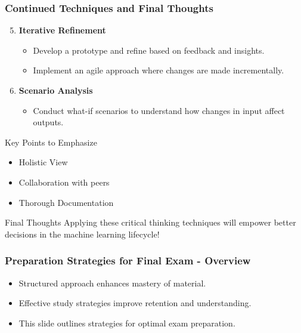 \documentclass[aspectratio=169]{beamer}
\begin{document}
\begin{frame}[fragile]
    \frametitle{Continued Techniques and Final Thoughts}
    \begin{enumerate}
        \setcounter{enumi}{4}
        \item \textbf{Iterative Refinement}
            \begin{itemize}
                \item Develop a prototype and refine based on feedback and insights.
                \item Implement an agile approach where changes are made incrementally.
            \end{itemize}
        \item \textbf{Scenario Analysis}
            \begin{itemize}
                \item Conduct what-if scenarios to understand how changes in input affect outputs.
            \end{itemize}
    \end{enumerate}
    
    \begin{block}{Key Points to Emphasize}
        \begin{itemize}
            \item Holistic View
            \item Collaboration with peers
            \item Thorough Documentation
        \end{itemize}
    \end{block}

    \begin{block}{Final Thoughts}
        Applying these critical thinking techniques will empower better decisions in the machine learning lifecycle!
    \end{block}
\end{frame}

\begin{frame}[fragile]
    \frametitle{Preparation Strategies for Final Exam - Overview}
    \begin{itemize}
        \item Structured approach enhances mastery of material.
        \item Effective study strategies improve retention and understanding.
        \item This slide outlines strategies for optimal exam preparation.
    \end{itemize}
\end{frame}
\end{document}
